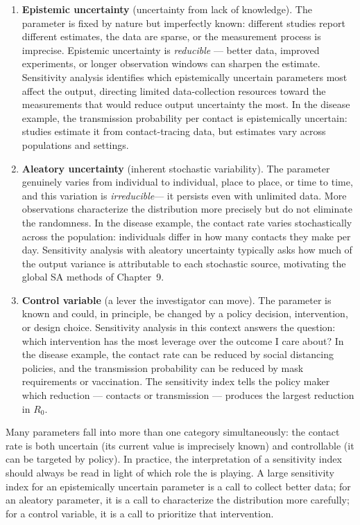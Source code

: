 \begin{enumerate}

\item \textbf{Epistemic uncertainty} (uncertainty from lack of knowledge).
The parameter is fixed by nature but imperfectly known: different studies
report different estimates, the data are sparse, or the measurement process
is imprecise. Epistemic uncertainty is \emph{reducible} --- better data,
improved experiments, or longer observation windows can sharpen the estimate.
Sensitivity analysis identifies which epistemically uncertain parameters
most affect the output, directing limited data-collection resources
toward the measurements that would reduce output uncertainty the most.
In the disease example, the transmission probability per contact is
epistemically uncertain: studies estimate it from contact-tracing data,
but estimates vary across populations and settings.

\item \textbf{Aleatory uncertainty} (inherent stochastic variability).
The parameter genuinely varies from individual to individual, place to
place, or time to time, and this variation is \emph{irreducible}---
it persists even with unlimited data. More observations characterize
the distribution more precisely but do not eliminate the randomness.
In the disease example, the contact rate varies stochastically
across the population: individuals differ in how many contacts they
make per day. Sensitivity analysis with aleatory uncertainty typically
asks how much of the output variance is attributable to each
stochastic source, motivating the global SA methods of Chapter~9.

\item \textbf{Control variable} (a lever the investigator can move).
The parameter is known and could, in principle, be changed by a policy
decision, intervention, or design choice. Sensitivity analysis in this
context answers the question: which intervention has the most leverage
over the outcome I care about? In the disease example, the contact rate
can be reduced by social distancing policies, and the transmission
probability can be reduced by mask requirements or vaccination. The
sensitivity index tells the policy maker which reduction --- contacts
or transmission --- produces the largest reduction in $R_0$.

\end{enumerate}

Many parameters fall into more than one category simultaneously:
the contact rate is both uncertain (its current value is imprecisely
known) and controllable (it can be targeted by policy).
In practice, the interpretation of a sensitivity index should
always be read in light of which role the \POI is playing.
A large sensitivity index for an epistemically uncertain parameter
is a call to collect better data; for an aleatory parameter, it is
a call to characterize the distribution more carefully; for a control
variable, it is a call to prioritize that intervention.


